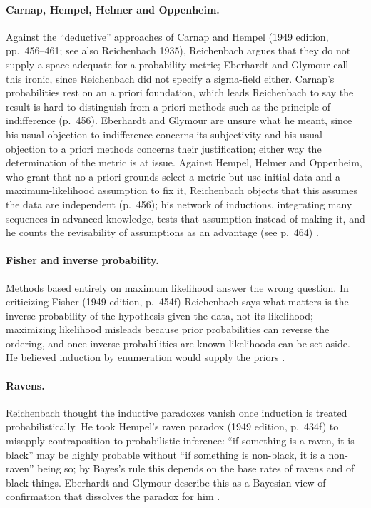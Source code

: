 \paragraph{Carnap, Hempel, Helmer and Oppenheim.} Against the
``deductive'' approaches of Carnap and Hempel (1949 edition,
pp.~456--461; see also Reichenbach 1935), Reichenbach argues that they do
not supply a space adequate for a probability metric; Eberhardt and Glymour call
this ironic, since Reichenbach did not specify a sigma-field either.
Carnap's probabilities rest on an a priori foundation, which leads
Reichenbach to say the result is hard to distinguish from a priori
methods such as the principle of indifference (p.~456). Eberhardt and Glymour are
unsure what he meant, since his usual objection to indifference concerns
its subjectivity and his usual objection to a priori methods concerns
their justification; either way the determination of the metric is at
issue. Against Hempel, Helmer and Oppenheim, who grant that no a priori
grounds select a metric but use initial data and a maximum-likelihood
assumption to fix it, Reichenbach objects that this assumes the data are
independent (p.~456); his network of inductions, integrating many
sequences in advanced knowledge, tests that assumption instead of making
it, and he counts the revisability of assumptions as an advantage (see
p.~464) \cite[p.~383]{EberhardtGlymour2011ReichenbachReading}.

\paragraph{Fisher and inverse probability.} Methods based entirely on
maximum likelihood answer the wrong question. In criticizing Fisher (1949
edition, p.~454f) Reichenbach says what matters is the inverse
probability of the hypothesis given the data, not its likelihood;
maximizing likelihood misleads because prior probabilities can reverse
the ordering, and once inverse probabilities are known likelihoods can be
set aside. He believed induction by enumeration would supply the priors
\cite[p.~383]{EberhardtGlymour2011ReichenbachReading}.

\paragraph{Ravens.} Reichenbach thought the inductive paradoxes vanish
once induction is treated probabilistically. He took Hempel's raven
paradox (1949 edition, p.~434f) to misapply contraposition to
probabilistic inference: ``if something is a raven, it is black'' may be
highly probable without ``if something is non-black, it is a non-raven''
being so; by Bayes's rule this depends on the base rates of ravens and of
black things. Eberhardt and Glymour describe this as a Bayesian view of
confirmation that dissolves the paradox for him
\cite[pp.~383--384]{EberhardtGlymour2011ReichenbachReading}.

